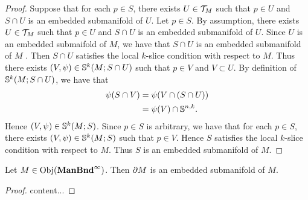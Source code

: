 \documentclass{book}
\begin{document}
	\begin{proof}
		Suppose that for each $p \in S$, there exists $U \in \MT_M$ such that $p \in U$ and $S \cap U$ is an embedded submanifold of $U$. Let $p \in S$. By assumption, there exists $U \in \MT_M$ such that $p \in U$ and $S \cap U$ is an embedded submanifold of $U$. Since $U$ is an embedded submaifold of $M$, we have that $S \cap U$ is an embedded submanifold of $M$ . Then $S \cap U$ satisfies the local $k$-slice condition with respect to $M$. Thus there exists $(V, \psi) \in \S^k(M; S \cap U)$ such that $p \in V$ and $V \subset U$. By definition of $\S^k(M; S \cap U)$, we have that 
		\begin{align*}
			\psi(S \cap V)
			& = \psi(V \cap (S \cap U)) \\
			& = \psi(V) \cap \S^{n,k}.
		\end{align*}
		Hence $(V, \psi) \in \S^k(M; S)$. Since $p \in S$ is arbitrary, we have that for each $p \in S$, there exists $(V, \psi) \in \S^k(M; S)$ such that $p \in V$. Hence $S$ satisfies the local $k$-slice condition with respect to $M$. Thus $S$ is an embedded submanifold of $M$. 
	\end{proof}


	\begin{ex}
		 Let $M \in \Obj(\ManBndinf)$. Then $\p M$ is an embedded submanifold of $M$.  
	\end{ex}	
	
	\begin{proof}
		content... 
	\end{proof}
	
\end{document}
